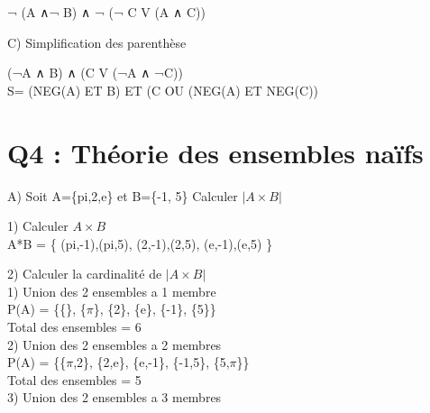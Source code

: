   ¬ (A ∧¬ B) ∧ ¬ (¬ C V (A ∧ C)) \\

\begin{flushleft}
C) Simplification des parenthèse \\
\end{flushleft}

  (¬A ∧ B) ∧ (C V (¬A ∧ ¬C)) \\

  S= (NEG(A) ET B) ET (C OU (NEG(A) ET NEG(C)) \\


\vspace{10mm} %

\section{Q4 : Théorie des ensembles naïfs}

\vspace{4mm} %

A) Soit A=\{pi,2,e\} et B=\{-1, 5\} Calculer ${|A\times B|}$ \\

\vspace{4mm} %

1) Calculer ${A\times B}$ \\

A*B = \{ (pi,-1),(pi,5), (2,-1),(2,5), (e,-1),(e,5) \}

\vspace{8mm} %

2) Calculer la cardinalité de ${|A\times B|}$ \\

1) Union des 2 ensembles a 1 membre \\

P(A) = \{\{\}, \{$\pi$\}, \{2\}, \{e\}, \{-1\}, \{5\}\} \\

Total des ensembles = 6 \\

2) Union des 2 ensembles a 2 membres \\

P(A) = \{\{$\pi$,2\}, \{2,e\}, \{e,-1\}, \{-1,5\}, \{5,$\pi$\}\} \\

Total des ensembles = 5 \\

3) Union des 2 ensembles a 3 membres \\

